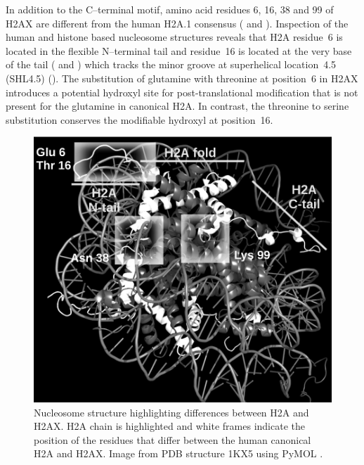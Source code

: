 In addition to the C--terminal motif, amino acid residues 6, 16, 38 and 99 of H2AX are different
from the human H2A.1 consensus ( and ). Inspection
of the human and  histone based nucleosome structures reveals that H2A residue~6 is
located in the flexible N--terminal tail and residue~16 is located at the very base of the tail
( and ) which tracks the minor groove at superhelical
location~4.5 (SHL4.5) (). The substitution of glutamine with threonine at
position~6 in H2AX introduces a potential hydroxyl site for post-translational modification that is
not present for the glutamine in canonical H2A. In contrast, the threonine to serine substitution
conserves the modifiable hydroxyl at position~16.

\begin{figure}
\includegraphics{h2ax-review/figs/Fig4}
\caption{Nucleosome structure highlighting differences between H2A and H2AX\@. H2A chain is
highlighted and white frames indicate the position of the residues that differ between the human
canonical H2A and H2AX\@. Image from PDB structure 1KX5 using PyMOL \protect\citep{DeL02}.}
\label{fig:h2ax-review:H2AInNucleosome}
\end{figure}

